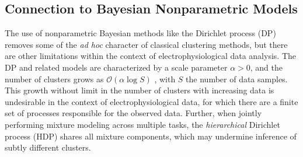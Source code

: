 \documentclass[journal]{IEEEtran}
\begin{document}
\subsection{Connection to Bayesian Nonparametric Models} %
\label{sub:connection_to_previous_bayesian_non_parametrics}


The use of nonparametric Bayesian methods like the Dirichlet process (DP) \cite{Wood2009,Bo2011} removes some of the \emph{ad hoc} character of classical clustering methods, but there are other limitations within the context of electrophysiological data analysis. The DP and related models are characterized by a scale parameter $\alpha>0$, and the number of clusters grows as $\mathcal{O}(\alpha \log S)$ \cite{Teh2010a}, with $S$ the number of data samples. This growth without limit in the number of clusters with increasing data is undesirable in the context of electrophysiological data, for which there are a finite set of processes responsible for the observed data. Further, when jointly performing mixture modeling across multiple tasks, the \emph{hierarchical} Dirichlet process (HDP) \cite{HDP} shares all mixture components, which may undermine inference of subtly different clusters.
\end{document}
